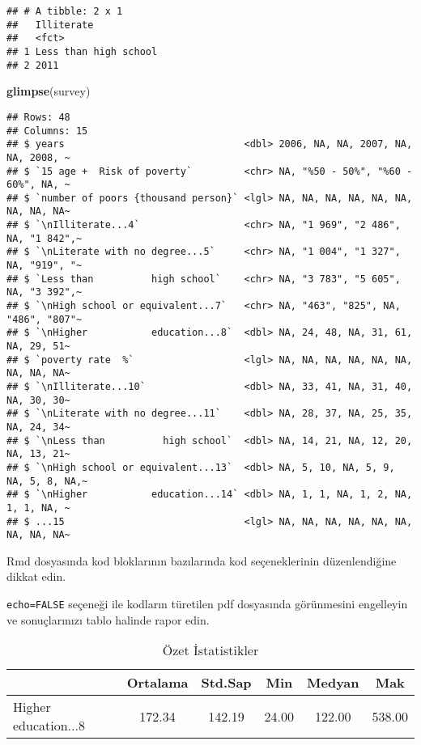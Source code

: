 \documentclass[
  12pt,
]{article}
\newenvironment{Shaded}{\begin{snugshade}}{\end{snugshade}}
\newcommand{\FunctionTok}[1]{\textcolor[rgb]{0.13,0.29,0.53}{\textbf{#1}}}
\newcommand{\NormalTok}[1]{#1}
\begin{document}
\begin{verbatim}
## # A tibble: 2 x 1
##   Illiterate           
##   <fct>                
## 1 Less than high school
## 2 2011
\end{verbatim}

\begin{Shaded}
\begin{Highlighting}[]
\FunctionTok{glimpse}\NormalTok{(survey)}
\end{Highlighting}
\end{Shaded}

\begin{verbatim}
## Rows: 48
## Columns: 15
## $ years                               <dbl> 2006, NA, NA, 2007, NA, NA, 2008, ~
## $ `15 age +  Risk of poverty`         <chr> NA, "%50 - 50%", "%60 - 60%", NA, ~
## $ `number of poors {thousand person}` <lgl> NA, NA, NA, NA, NA, NA, NA, NA, NA~
## $ `\nIlliterate...4`                  <chr> NA, "1 969", "2 486", NA, "1 842",~
## $ `\nLiterate with no degree...5`     <chr> NA, "1 004", "1 327", NA, "919", "~
## $ `Less than          high school`    <chr> NA, "3 783", "5 605", NA, "3 392",~
## $ `\nHigh school or equivalent...7`   <chr> NA, "463", "825", NA, "486", "807"~
## $ `\nHigher           education...8`  <dbl> NA, 24, 48, NA, 31, 61, NA, 29, 51~
## $ `poverty rate  %`                   <lgl> NA, NA, NA, NA, NA, NA, NA, NA, NA~
## $ `\nIlliterate...10`                 <dbl> NA, 33, 41, NA, 31, 40, NA, 30, 30~
## $ `\nLiterate with no degree...11`    <dbl> NA, 28, 37, NA, 25, 35, NA, 24, 34~
## $ `\nLess than          high school`  <dbl> NA, 14, 21, NA, 12, 20, NA, 13, 21~
## $ `\nHigh school or equivalent...13`  <dbl> NA, 5, 10, NA, 5, 9, NA, 5, 8, NA,~
## $ `\nHigher           education...14` <dbl> NA, 1, 1, NA, 1, 2, NA, 1, 1, NA, ~
## $ ...15                               <lgl> NA, NA, NA, NA, NA, NA, NA, NA, NA~
\end{verbatim}

Rmd dosyasında kod bloklarının bazılarında kod seçeneklerinin düzenlendiğine dikkat edin.

\texttt{echo=FALSE} seçeneği ile kodların türetilen pdf dosyasında görünmesini engelleyin ve sonuçlarınızı tablo halinde rapor edin.

\begin{table}[ht]
\centering
\caption{Özet İstatistikler} 
\label{tab:ozet}
\begin{tabular}{lccccc}
  \toprule
 & Ortalama & Std.Sap & Min & Medyan & Mak \\ 
  \midrule

Higher           education...8 & 172.34 & 142.19 & 24.00 & 122.00 & 538.00 \\ 
   \bottomrule
\end{tabular}
\end{table}
\end{document}
